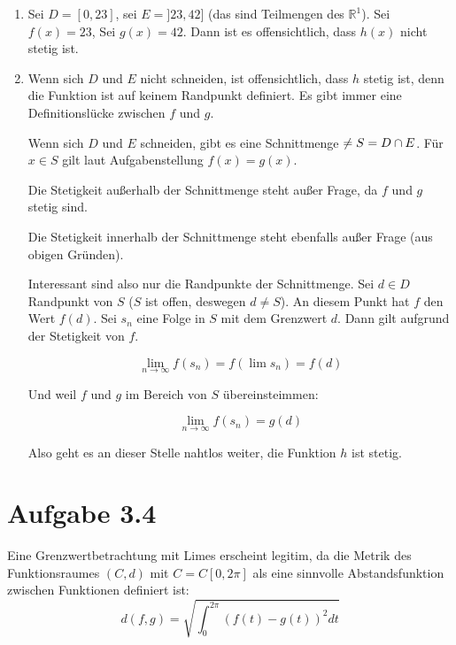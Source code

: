 \documentclass[a4paper,german,12pt,smallheadings]{scrartcl}
\begin{document}
\begin{enumerate}[(1)]
  \item
    Sei $D = [0,23]$, sei $E = ]23,42]$ (das sind Teilmengen des
    $\mathbb{R}^1$). Sei $f(x) = 23$, Sei $g(x) = 42$. Dann ist es
    offensichtlich, dass $h(x)$ nicht stetig ist.

  \item
    Wenn sich $D$ und $E$ nicht schneiden, ist offensichtlich, dass $h$ stetig
    ist, denn die Funktion ist auf keinem Randpunkt definiert. Es gibt immer
    eine Definitionslücke zwischen $f$ und $g$.

    Wenn sich $D$ und $E$ schneiden, gibt es eine Schnittmenge $\empty \neq S = D \cap E$.
    Für $x \in S$ gilt laut Aufgabenstellung $f(x) = g(x)$.

    Die Stetigkeit außerhalb der Schnittmenge steht außer Frage, da $f$ und
    $g$ stetig sind.

    Die Stetigkeit innerhalb der Schnittmenge steht ebenfalls außer Frage (aus
    obigen Gründen).

    Interessant sind also nur die Randpunkte der Schnittmenge. Sei $d \in D$
    Randpunkt von $S$ ($S$ ist offen, deswegen $d \neq S$). An diesem Punkt hat
    $f$ den Wert $f(d)$. Sei $s_n$ eine Folge in $S$ mit dem Grenzwert $d$.
    Dann gilt aufgrund der Stetigkeit von $f$.

    \begin{equation*}
      \lim_{n \to \infty} f(s_n) = f(\lim s_n) = f(d)
    \end{equation*}

    Und weil $f$ und $g$ im Bereich von $S$ übereinsteimmen:

    \begin{equation*}
      \lim_{n \to \infty} f(s_n) = g(d)
    \end{equation*}

    Also geht es an dieser Stelle nahtlos weiter, die Funktion $h$ ist stetig.
\end{enumerate}

\section*{Aufgabe 3.4}

Eine Grenzwertbetrachtung mit Limes erscheint legitim, da die Metrik des Funktionsraumes $(C,d)$ mit $C=C[0,2\pi]$ als eine sinnvolle Abstandsfunktion zwischen Funktionen definiert ist:
\begin{equation*}
d(f,g)=\sqrt{\int_{0}^{2\pi}\left(f(t)-g(t)\right)^2dt}
\end{equation*}
\end{document}
